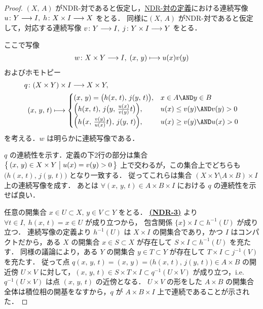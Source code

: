 \documentclass[algtopo_main]{subfiles}
\begin{document}
\begin{proof}
    $(X,\, A)$ がNDR-対であると仮定し，\hyperref[def:NDR]{NDR-対の定義}における連続写像 $u \colon Y \longrightarrow I,\; h \colon X \times I \longrightarrow X$ をとる．
    同様に$(X,\, A)$ がNDR-対であると仮定して，対応する連続写像 $v \colon Y \longrightarrow I,\; j \colon Y \times I \longrightarrow Y$ をとる．

    ここで写像
    \begin{align}
        w \colon X \times Y \longrightarrow I,\; (x,\, y) \longmapsto u(x) v(y)
    \end{align}
    およびホモトピー
    \begin{align}
        q &\colon (X \times Y) \times I \lto X \times Y,\\ 
        &(x,\, y,\, t) \lmto 
        \begin{cases}
            (x,\, y) = \bigl( h(x,\, t),\, j(y,\, t) \bigr), &x \in A \AND y \in B \\
            \Bigl( h(x,\, t),\, j \bigl(y,\, \frac{u(x)}{v(y)} t \bigr)  \Bigr), &u(x) \le v(y) \AND v(y) > 0 \\
            \Bigl( h \bigl( x,\, \frac{v(y)}{u(x)}t \bigr),\, j(y,\, t)  \Bigr), &u(x) \ge v(y) \AND u(x) > 0
        \end{cases}
    \end{align}
    を考える．$w$ は明らかに連続写像である．
    
    $q$ の連続性を示す．定義の下2行の部分は集合 $\bigl\{\, (x,\, y) \in X \times Y \bigm| u(x) = v(y) > 0 \,\bigr\}$ 上で交わるが，この集合上でどちらも $\bigl( h(x,\, t),\, j(y,\, t) \bigr)$ となり一致する．
    従ってこれらは集合 $(X \times Y \setminus A \times B) \times I$ 上の連続写像を成す．
    あとは $\forall (x,\, y,\, t) \in A \times B \times I$ における $q$ の連続性を示せば良い．
    
    任意の開集合 $x \in U \subset X,\, y \in V \subset Y$ をとる．
    \hyperref[def:NDR]{\textbf{\textsf{(NDR-3)}}} より $\forall t \in I,\; h(x,\, t) = x \in U$ が成り立つから，
    包含関係 $\{x\} \times I \subset h^{-1}(U)$ が成り立つ．
    連続写像の定義より $h^{-1}(U)$ は $X \times I$ の開集合であり，かつ $I$ はコンパクトだから，ある $X$ の開集合 $x \in S \subset X$ が存在して $S \times I \subset h^{-1}(U)$ を充たす．
    同様の議論により，ある $Y$ の開集合 $y \in T \subset Y$ が存在して $T \times I \subset j^{-1}(V)$ を充たす．
    従って点 $q(x,\, y,\, t) = (x,\, y) = \bigl( h(x,\, t),\, j(y,\, t) \bigr)  \in A \times B$ の開近傍 $U \times V$ に対して，$(x,\, y,\, t) \in S \times T \times I \subset q^{-1}(U \times V)$ が成り立つ，i.e. $q^{-1}(U \times V)$ は点 $(x,\, y,\, t)$ の近傍となる．
    $U \times V$ の形をした $A \times B$ の開集合全体は積位相の開基をなすから，$q$ が $A \times B \times I$ 上で連続であることが示された．


\end{proof}
\end{document}
